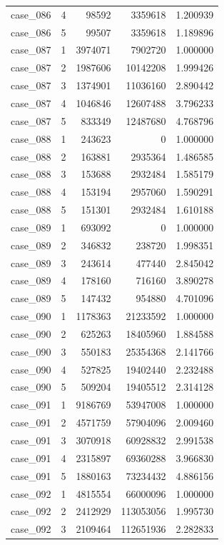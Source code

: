 \begin{longtable}{lrrrr}
case\_086 & 4 & 98592 & 3359618 & 1.200939 \\
case\_086 & 5 & 99507 & 3359618 & 1.189896 \\
case\_087 & 1 & 3974071 & 7902720 & 1.000000 \\
case\_087 & 2 & 1987606 & 10142208 & 1.999426 \\
case\_087 & 3 & 1374901 & 11036160 & 2.890442 \\
case\_087 & 4 & 1046846 & 12607488 & 3.796233 \\
case\_087 & 5 & 833349 & 12487680 & 4.768796 \\
case\_088 & 1 & 243623 & 0 & 1.000000 \\
case\_088 & 2 & 163881 & 2935364 & 1.486585 \\
case\_088 & 3 & 153688 & 2932484 & 1.585179 \\
case\_088 & 4 & 153194 & 2957060 & 1.590291 \\
case\_088 & 5 & 151301 & 2932484 & 1.610188 \\
case\_089 & 1 & 693092 & 0 & 1.000000 \\
case\_089 & 2 & 346832 & 238720 & 1.998351 \\
case\_089 & 3 & 243614 & 477440 & 2.845042 \\
case\_089 & 4 & 178160 & 716160 & 3.890278 \\
case\_089 & 5 & 147432 & 954880 & 4.701096 \\
case\_090 & 1 & 1178363 & 21233592 & 1.000000 \\
case\_090 & 2 & 625263 & 18405960 & 1.884588 \\
case\_090 & 3 & 550183 & 25354368 & 2.141766 \\
case\_090 & 4 & 527825 & 19402440 & 2.232488 \\
case\_090 & 5 & 509204 & 19405512 & 2.314128 \\
case\_091 & 1 & 9186769 & 53947008 & 1.000000 \\
case\_091 & 2 & 4571759 & 57904096 & 2.009460 \\
case\_091 & 3 & 3070918 & 60928832 & 2.991538 \\
case\_091 & 4 & 2315897 & 69360288 & 3.966830 \\
case\_091 & 5 & 1880163 & 73234432 & 4.886156 \\
case\_092 & 1 & 4815554 & 66000096 & 1.000000 \\
case\_092 & 2 & 2412929 & 113053056 & 1.995730 \\
case\_092 & 3 & 2109464 & 112651936 & 2.282833 \\

\end{longtable}
